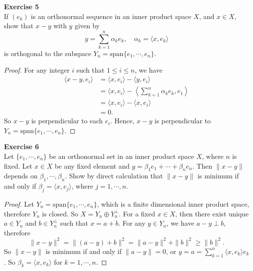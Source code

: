 \documentclass[12pt, a4paper]{article}
\theoremstyle{plain}
\newenvironment{exercise}[2][Exercise]
    { \begin{mdframed}[backgroundcolor=gray!20] \textbf{#1 #2} \\}
    {  \end{mdframed}}
\begin{document}
\begin{exercise}{5}
If $(e_k)$ is an orthonormal sequence in an inner product space $X$, and $x\in X$, show that $x-y$ with $y$ given by
\[
y=\sum_{k=1}^{n}{\alpha_ke_k}, \quad \alpha_k=\langle{x,e_k}\rangle
\]
is orthogonal to the subspace $Y_n=\text{span}\{e_1,\cdots,e_n\}$.
\end{exercise}
	\begin{proof}
	For any integer $i$ such that $1\leq i\leq n$, we have
	\begin{align*}
	\langle{x-y,e_i}\rangle &= \langle{x,e_i}\rangle - \langle{y,e_i}\rangle\\
	&= \langle{x,e_i}\rangle - \left\langle{\sum_{k=1}^{n}{\alpha_ke_k	},e_1}\right\rangle\\
	&= \langle{x,e_i}\rangle - \langle{x,e_i}\rangle\\
	&= 0.
	\end{align*}
	So $x-y$ is perpendicular to each $e_i$. Hence, $x-y$ is perpendicular to $Y_n=\text{span}\{e_1,\cdots,e_n\}$.
	\end{proof}

\begin{exercise}{6}
Let $\{e_1,\cdots,e_n\}$ be an orthonormal set in an inner product space $X$, where $n$ is fixed. Let $x\in X$ be any fixed element and $y=\beta_1e_1+\cdots+\beta_ne_n$. Then $\|x-y\|$ depends on $\beta_1,\cdots,\beta_n$. Show by direct calculation that $\|x-y\|$ is minimum if and only if $\beta_j=\langle{x,e_j}\rangle$, where $j=1,\cdots,n$.
\end{exercise}
	\begin{proof}
	Let $Y_n=\text{span}\{e_1,\cdots,e_n\}$, which is a finite dimensional inner product space, therefore $Y_n$ is closed. So $X=Y_n\oplus Y_n^\perp$. For a fixed $x\in X$, then there exist unique $a\in Y_n$ and $b\in Y_n^\perp$ such that $x=a+b$. For any $y\in Y_n$, we have $a-y\perp b$, therefore
	\[
	\|x-y\|^2=\|(a-y)+b\|^2=\|a-y\|^2+\|b\|^2\geq \|b\|^2.
	\]
	So $\|x-y\|$ is minimum if and only if $\|a-y\|=0$, or $y=a=\sum_{k=1}^{n}{\langle{x,e_k}\rangle e_k}$. So $\beta_k=\langle{x,e_k}\rangle$ for $k=1,\cdots,n$.
	\end{proof}
\end{document}
